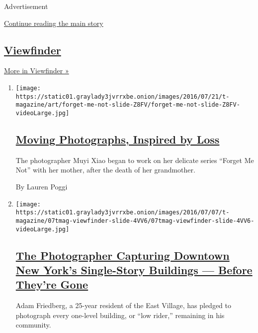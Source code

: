 Advertisement

\protect\hyperlink{after-mid1}{Continue reading the main story}

\hypertarget{viewfinder}{%
\subsection{\texorpdfstring{\href{/column/viewfinder}{Viewfinder}}{Viewfinder}}\label{viewfinder}}

\href{/column/viewfinder}{More in Viewfinder »}

\begin{enumerate}
\def\labelenumi{\arabic{enumi}.}
\item
  \texttt{[image: https://static01.graylady3jvrrxbe.onion/images/2016/07/21/t-magazine/art/forget-me-not-slide-Z8FV/forget-me-not-slide-Z8FV-videoLarge.jpg]}

  \hypertarget{moving-photographs-inspired-by-loss}{%
  \subsection{\texorpdfstring{\href{/slideshow/2016/07/21/t-magazine/art/muyi-xiao-photographer-alzheimers.html}{Moving
  Photographs, Inspired by
  Loss}}{Moving Photographs, Inspired by Loss}}\label{moving-photographs-inspired-by-loss}}

  The photographer Muyi Xiao began to work on her delicate series
  ``Forget Me Not'' with her mother, after the death of her grandmother.

  By Lauren Poggi
\item
  \texttt{[image: https://static01.graylady3jvrrxbe.onion/images/2016/07/07/t-magazine/07tmag-viewfinder-slide-4VV6/07tmag-viewfinder-slide-4VV6-videoLarge.jpg]}

  \hypertarget{the-photographer-capturing-downtown-new-yorks-single-story-buildings--before-theyre-gone}{%
  \subsection{\texorpdfstring{\href{/slideshow/2016/07/07/t-magazine/adam-friedberg-east-village-nyc-buildings.html}{The
  Photographer Capturing Downtown New York's Single-Story Buildings ---
  Before They're
  Gone}}{The Photographer Capturing Downtown New York's Single-Story Buildings --- Before They're Gone}}\label{the-photographer-capturing-downtown-new-yorks-single-story-buildings--before-theyre-gone}}

  Adam Friedberg, a 25-year resident of the East Village, has pledged to
  photograph every one-level building, or ``low rider,'' remaining in
  his community.


\end{enumerate}
